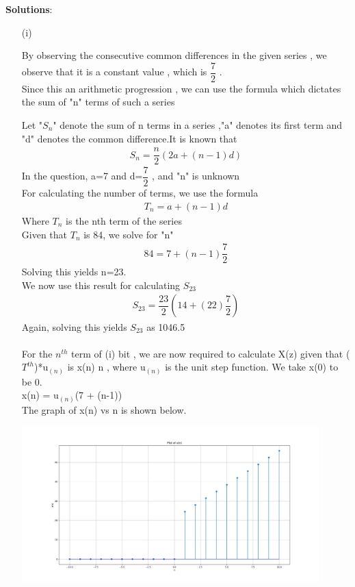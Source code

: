 \documentclass[journal,12pt,twocolumn]{IEEEtran}
\theoremstyle{remark}
\begin{document}
\vspace{0.5cm}
\textbf{Solutions}:
\begin{enumerate}
\item[(i)]   

By observing the consecutive common differences in the given series , we observe that it is a constant value , which is $\dfrac{7}{2}$ .\\
Since this an arithmetic progression , we can use the formula which dictates the sum of "n" terms of such a series

Let "$S_n$" denote the sum of n terms in a series ,"a" denotes its first term and "d" denotes the common difference.It is known that
\begin{align}
{S_n} = \dfrac{n}{2}(2a + (n-1)d)\label{eq:1}
\end{align}
In the question, a=7 and d=$\dfrac{7}{2}$ , and "n" is unknown\\
For calculating the number of terms, we use the formula
\begin{align}
{T_n} = a + (n-1)d\label{eq:2}
\end{align}
Where $T_n$ is the nth term of the series\\
Given that $T_n$ is 84, we solve for "n"
\begin{align}  
84 = 7+(n-1)\dfrac{7}{2}
\end{align}
Solving this yields n=23.\\
We now use this result for calculating $S_{23}$
\begin{align}
    S_{23} = \dfrac{23}{2}(14+(22)\dfrac{7}{2})
    \end{align}
Again, solving this yields $S_{23}$ as 1046.5\\\\
For the $n^{th}$ term of (i) bit , we are now required to calculate X(z) given that ($T^{th}$)*u$_{(n)}$ is x(n) \forall n , where u$_{(n)}$ is the unit step function. We take x(0) to be 0.\\
x(n) = u$_{(n)}$(7 + (n-1))\\

The graph of x(n) vs n is shown below.\\
\graphicspath{ {pictures/} }
\includegraphics[width=10.cm, height=6cm]{Figure_1}



\end{enumerate}
\end{document}
